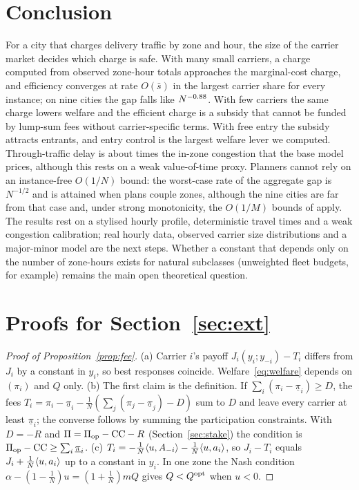 \documentclass[preprint,11pt,authoryear]{elsarticle}
\theoremstyle{plain}
\theoremstyle{remark}
\begin{document}
\section{Conclusion}\label{sec:conclusion}
For a city that charges delivery traffic by zone and hour, the size of the carrier market decides which charge is safe. With many small carriers, a charge computed from observed zone-hour totals approaches the marginal-cost charge, and efficiency converges at rate $O(\bar s)$ in the largest carrier share for every instance; on nine cities the gap falls like $N^{-0.88}$. With few carriers the same charge lowers welfare and the efficient charge is a subsidy that cannot be funded by lump-sum fees without carrier-specific terms. With free entry the subsidy attracts entrants, and entry control is the largest welfare lever we computed. Through-traffic delay is about \ExtRatioKQ{} times the in-zone congestion that the base model prices, although this rests on a weak value-of-time proxy. Planners cannot rely on an instance-free $O(1/N)$ bound: the worst-case rate of the aggregate gap is $N^{-1/2}$ and is attained when plans couple zones, although the nine cities are far from that case and, under strong monotonicity, the $O(1/M)$ bounds of \citet{Paccagnan2019} apply. The results rest on a stylised hourly profile, deterministic travel times and a weak congestion calibration; real hourly data, observed carrier size distributions and a major-minor model are the next steps. Whether a constant that depends only on the number of zone-hours exists for natural subclasses (unweighted fleet budgets, for example) remains the main open theoretical question.

\appendix
\section{Proofs for Section~\ref{sec:ext}}\label{app:proofs}
\begin{proof}[Proof of Proposition~\ref{prop:fee}]
(a) Carrier $i$'s payoff $J_i(y_i;y_{-i})-T_i$ differs from $J_i$ by a constant in $y_i$, so best responses coincide. Welfare~\eqref{eq:welfare} depends on $(\pi_i)$ and $Q$ only. (b) The first claim is the definition. If $\sum_i(\pi_i-\underline\pi_i)\ge D$, the fees $T_i=\pi_i-\underline\pi_i-\tfrac1N(\sum_j(\pi_j-\underline\pi_j)-D)$ sum to $D$ and leave every carrier at least $\underline\pi_i$; the converse follows by summing the participation constraints. With $D=-R$ and $\Pi=\Pi_{\rm op}-\mathrm{CC}-R$ (Section~\ref{sec:stake}) the condition is $\Pi_{\rm op}-\mathrm{CC}\ge\sum_i\underline\pi_i$. (c) $T_i=-\tfrac1N\langle u,A_{-i}\rangle-\tfrac1N\langle u,a_i\rangle$, so $J_i-T_i$ equals $J_i+\tfrac1N\langle u,a_i\rangle$ up to a constant in $y_i$. In one zone the Nash condition $\alpha-(1-\tfrac1N)u=(1+\tfrac1N)mQ$ gives $Q<Q^{\mathrm{opt}}$ when $u<0$.
\end{proof}
\end{document}
